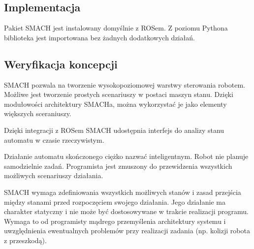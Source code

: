 \subsection{Implementacja}
Pakiet SMACH jest instalowany domyślnie z ROSem. Z poziomu Pythona biblioteka jest importowana bez żadnych dodatkowych działań.

\subsection{Weryfikacja koncepcji}
SMACH pozwala na tworzenie wysokopoziomowej warstwy sterowania robotem. Możliwe jest tworzenie prostych scenariuszy w postaci maszyn stanu. Dzięki modułowości architektury SMACHa, można wykorzystać je jako elementy większych sceraniuszy. 

Dzięki integracji z ROSem SMACH udostępnia interfejs do analizy stanu automatu w czasie rzeczywistym. 

Działanie automatu skończonego ciężko nazwać inteligentnym. Robot nie planuje samodzielnie zadań. Programista jest zmuszony do przewidzenia wszystkich możliwych scenariuszy działania. 

SMACH wymaga zdefiniowania wszystkich możliwych stanów i zasad przejścia między stanami przed rozpoczęciem swojego działania. Jego działanie ma charakter statyczny i nie może być dostosowywane w trakcie realizacji programu. Wymaga to od programisty mądrego przemyślenia architektury systemu i uwzględnienia ewentualnych problemów przy realizacji zadania (np. kolizji robota z przeszkodą). 



